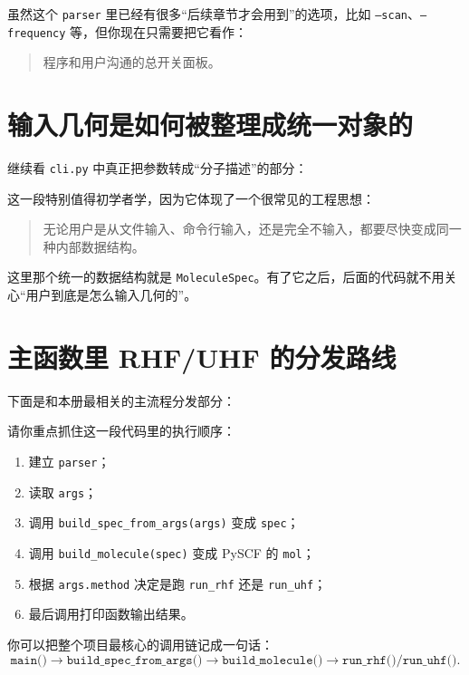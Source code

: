 \documentclass[UTF8,11pt,fontset=fandol]{ctexbook}
\begin{document}
虽然这个 \texttt{parser} 里已经有很多“后续章节才会用到”的选项，比如 \texttt{--scan}、\texttt{--frequency} 等，但你现在只需要把它看作：

\begin{quote}
程序和用户沟通的总开关面板。
\end{quote}

\section{输入几何是如何被整理成统一对象的}

继续看 \texttt{cli.py} 中真正把参数转成“分子描述”的部分：



这一段特别值得初学者学，因为它体现了一个很常见的工程思想：

\begin{quote}
无论用户是从文件输入、命令行输入，还是完全不输入，都要尽快变成同一种内部数据结构。
\end{quote}

这里那个统一的数据结构就是 \texttt{MoleculeSpec}。有了它之后，后面的代码就不用关心“用户到底是怎么输入几何的”。

\section{主函数里 RHF/UHF 的分发路线}

下面是和本册最相关的主流程分发部分：



请你重点抓住这一段代码里的执行顺序：

\begin{enumerate}[label=\arabic*.]
  \item 建立 \texttt{parser}；
  \item 读取 \texttt{args}；
  \item 调用 \texttt{build\_spec\_from\_args(args)} 变成 \texttt{spec}；
  \item 调用 \texttt{build\_molecule(spec)} 变成 PySCF 的 \texttt{mol}；
  \item 根据 \texttt{args.method} 决定是跑 \texttt{run\_rhf} 还是 \texttt{run\_uhf}；
  \item 最后调用打印函数输出结果。
\end{enumerate}

你可以把整个项目最核心的调用链记成一句话：
\begin{equation}
\texttt{main()} \longrightarrow \texttt{build\_spec\_from\_args()} \longrightarrow \texttt{build\_molecule()} \longrightarrow \texttt{run\_rhf()/run\_uhf()}.
\end{equation}
\end{document}
